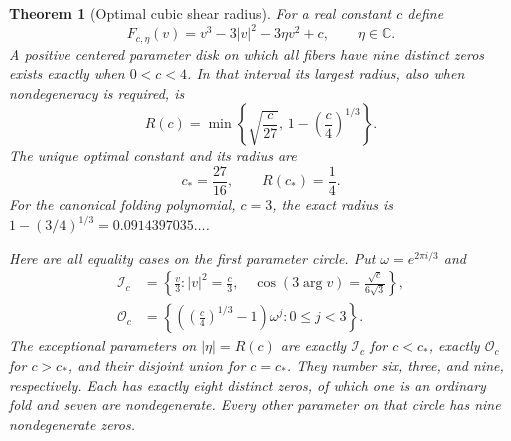 \documentclass[UTF8,11pt]{ctexart}
\newtheorem{thm}{Theorem}[section]
\theoremstyle{definition}
\numberwithin{equation}{section}
\newcommand{\C}{\mathbb C}\newcommand{\R}{\mathbb R}
\begin{document}
\begin{thm}[Optimal cubic shear radius]\label{v18:thm:shear}
For a real constant $c$ define
\[
 F_{c,\eta}(v)=v^3-3|v|^2-3\eta v^2+c,
 \qquad \eta\in\C.
\]
A positive centered parameter disk on which all fibers have nine
distinct zeros exists exactly when $0<c<4$. In that interval its
largest radius, also when nondegeneracy is required, is
\begin{equation}\label{v18:eq:radius}
 R(c)=\min\left\{\sqrt{\frac c{27}},\,
                     1-\left(\frac c4\right)^{1/3}\right\}.
\end{equation}
The unique optimal constant and its radius are
\begin{equation}\label{v18:eq:optimum}
 c_* =\frac{27}{16},\qquad R(c_*)=\frac14.
\end{equation}
For the canonical folding polynomial, $c=3$, the exact radius is
$1-(3/4)^{1/3}=0.0914397035\ldots$.

Here are all equality cases on the first parameter circle. Put
$\omega=e^{2\pi i/3}$ and
\begin{align*}
 \mathcal I_c&=\left\{\frac v3:
 |v|^2=\frac c3,\quad
 \cos(3\arg v)=\frac{\sqrt c}{6\sqrt3}\right\},\\
 \mathcal O_c&=\left\{\left(\left(\frac c4\right)^{1/3}-1\right)
                  \omega^j:0\le j<3\right\}.
\end{align*}
The exceptional parameters on $|\eta|=R(c)$ are exactly
$\mathcal I_c$ for $c<c_*$, exactly $\mathcal O_c$ for $c>c_*$,
and their disjoint union for $c=c_*$. They number six, three,
and nine, respectively. Each has exactly eight distinct zeros,
of which one is an ordinary fold and seven are nondegenerate.
Every other parameter on that circle has nine nondegenerate zeros.
\end{thm}
\end{document}
